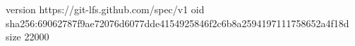 version https://git-lfs.github.com/spec/v1
oid sha256:69062787f9ae72076d6077dde4154925846f2c6b8a2594197111758652a4f18d
size 22000
